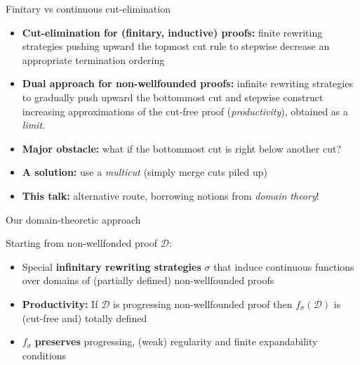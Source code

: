 \documentclass[10pt]{beamer}
\theoremstyle{definition}
\theoremstyle{plain}
\newcommand{\red}[1]{{\color{red}#1}}
\renewcommand{\red}{\alert}
\newcommand\coloreditem[1]{\item[\textcolor{#1}{\usebeamertemplate{itemize  item}}]}
\newcommand{\der}{\mathcal{D}}
\begin{document}
	\begin{frame}{Finitary vs continuous cut-elimination}
		\begin{itemize}
		 \item \textbf{Cut-elimination for (finitary, inductive) proofs:} finite rewriting strategies pushing upward the topmost cut rule to stepwise decrease an  appropriate termination ordering 
		 \medskip\pause 
		 \item \textbf{Dual approach for non-wellfounded proofs:} infinite rewriting strategies to gradually push upward the bottommost cut and stepwise construct increasing approximations of the cut-free proof (\emph{productivity}),  obtained as a \emph{limit}. 
		 \bigskip \bigskip \pause 
		 \coloreditem{myred} \red{\textbf{Major obstacle:}} what if the bottommost cut is right below another cut?
		 \medskip\pause 
		 \item[] \textbf{A solution:} use a \emph{multicut} (simply merge cuts piled up)
		 \medskip\pause 
		 \item[] \textbf{This talk:}  alternative route,  borrowing notions from \emph{domain theory}!
		\end{itemize}
	\end{frame}

\begin{frame}{Our domain-theoretic approach}
 
 Starting from non-wellfonded proof $\der$:
\begin{itemize}
	\bigskip
	\item  Special \textbf{infinitary rewriting strategies} $\sigma$  that induce continuous functions  over domains of (partially defined) non-wellfounded proofs
	\bigskip\pause 
	\item \textbf{Productivity:} If $\der$ is  progressing non-wellfounded proof then $f_\sigma (\der)$ is (cut-free and)  totally defined 
	\bigskip\pause 
	\item   $f_\sigma$ \textbf{preserves} progressing, (weak) regularity and finite expandability conditions
\end{itemize}
\end{frame}
\end{document}
